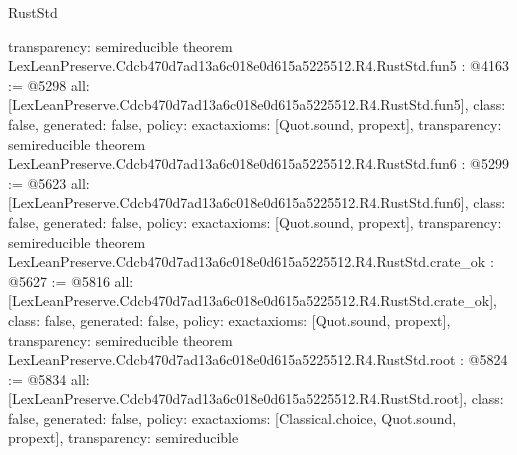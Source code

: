 \begin{lexlean}{RustStd}
\begin{coremodule}
{  transparency: semireducible
}
theorem LexLeanPreserve.Cdcb470d7ad13a6c018e0d615a5225512.R4.RustStd.fun5 : @4163 := @5298 {
  all: [LexLeanPreserve.Cdcb470d7ad13a6c018e0d615a5225512.R4.RustStd.fun5],
  class: false,
  generated: false,
  policy: exact{axioms: [Quot.sound, propext]},
  transparency: semireducible
}
theorem LexLeanPreserve.Cdcb470d7ad13a6c018e0d615a5225512.R4.RustStd.fun6 : @5299 := @5623 {
  all: [LexLeanPreserve.Cdcb470d7ad13a6c018e0d615a5225512.R4.RustStd.fun6],
  class: false,
  generated: false,
  policy: exact{axioms: [Quot.sound, propext]},
  transparency: semireducible
}
theorem LexLeanPreserve.Cdcb470d7ad13a6c018e0d615a5225512.R4.RustStd.crate_ok : @5627 := @5816 {
  all: [LexLeanPreserve.Cdcb470d7ad13a6c018e0d615a5225512.R4.RustStd.crate_ok],
  class: false,
  generated: false,
  policy: exact{axioms: [Quot.sound, propext]},
  transparency: semireducible
}
theorem LexLeanPreserve.Cdcb470d7ad13a6c018e0d615a5225512.R4.RustStd.root : @5824 := @5834 {
  all: [LexLeanPreserve.Cdcb470d7ad13a6c018e0d615a5225512.R4.RustStd.root],
  class: false,
  generated: false,
  policy: exact{axioms: [Classical.choice, Quot.sound, propext]},
  transparency: semireducible
}


\end{coremodule}
\end{lexlean}

